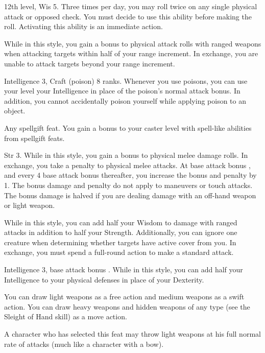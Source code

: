 \featpre 12th level, Wis 5.
\featben Three times per day, you may roll twice on any single physical attack or opposed check. You must decide to use this ability before making the roll. Activating this ability is an immediate action.

 While in this style, you gain a  bonus to physical attack rolls with ranged weapons when attacking targets within half of your range increment. In exchange, you are unable to attack targets beyond your range increment.

\featpre Intelligence 3, Craft (poison) 8 ranks.
\featben Whenever you use poisons, you can use your level \add your Intelligence in place of the poison's normal attack bonus. In addition, you cannot accidentally poison yourself while applying poison to an object.

\featpre Any spellgift feat.
\featben You gain a  bonus to your caster level with spell-like abilities from spellgift feats.

 Str 3.
 While in this style, you gain a  bonus to physical melee damage rolls. In exchange, you take a  penalty to physical melee attacks. At base attack bonus , and every 4 base attack bonus thereafter, you increase the bonus and penalty by 1. The bonus damage and penalty do not apply to maneuvers or touch attacks. The bonus damage is halved if you are dealing damage with an off-hand weapon or light weapon.

 While in this style, you can add half your Wisdom to damage with ranged attacks in addition to half your Strength. Additionally, you can ignore one creature when determining whether targets have active cover from you. In exchange, you must spend a full-round action to make a standard attack.

\featpre Intelligence 3, base attack bonus .
\featben While in this style, you can add half your Intelligence to your physical defenses in place of your Dexterity.

 You can draw light weapons as a free action and medium weapons as a swift action. You can draw heavy weapons and hidden weapons of any type (see the Sleight of Hand skill) as a move action.
\par A character who has selected this feat may throw light weapons at his full normal rate of attacks (much like a character with a bow).

